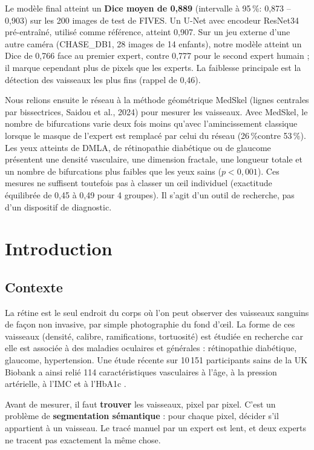 \documentclass[11pt,a4paper]{article}
\newcommand{\pct}{\,\%}
\begin{document}
Le modèle final atteint un \textbf{Dice moyen de 0,889} (intervalle à 95\pct : 0,873 -- 0,903) sur les 200 images de test de FIVES. Un U-Net avec encodeur ResNet34 pré-entraîné, utilisé comme référence, atteint 0,907. Sur un jeu externe d'une autre caméra (CHASE\_DB1, 28 images de 14 enfants), notre modèle atteint un Dice de 0,766 face au premier expert, contre 0,777 pour le second expert humain ; il marque cependant plus de pixels que les experts. La faiblesse principale est la détection des vaisseaux les plus fins (rappel de 0,46).

Nous relions ensuite le réseau à la méthode géométrique MedSkel (lignes centrales par bissectrices, Saidou et al., 2024) pour mesurer les vaisseaux. Avec MedSkel, le nombre de bifurcations varie deux fois moins qu'avec l'amincissement classique lorsque le masque de l'expert est remplacé par celui du réseau (26\pct contre 53\pct). Les yeux atteints de DMLA, de rétinopathie diabétique ou de glaucome présentent une densité vasculaire, une dimension fractale, une longueur totale et un nombre de bifurcations plus faibles que les yeux sains ($p<0{,}001$). Ces mesures ne suffisent toutefois pas à classer un œil individuel (exactitude équilibrée de 0,45 à 0,49 pour 4 groupes). Il s'agit d'un outil de recherche, pas d'un dispositif de diagnostic.

\tableofcontents
\newpage

\section{Introduction}

\subsection{Contexte}
La rétine est le seul endroit du corps où l'on peut observer des vaisseaux sanguins de façon non invasive, par simple photographie du fond d'œil. La forme de ces vaisseaux (densité, calibre, ramifications, tortuosité) est étudiée en recherche car elle est associée à des maladies oculaires et générales : rétinopathie diabétique, glaucome, hypertension. Une étude récente sur 10\,151 participants sains de la UK Biobank a ainsi relié 114 caractéristiques vasculaires à l'âge, à la pression artérielle, à l'IMC et à l'HbA1c \cite{yusufu}.

Avant de mesurer, il faut \textbf{trouver} les vaisseaux, pixel par pixel. C'est un problème de \textbf{segmentation sémantique} : pour chaque pixel, décider s'il appartient à un vaisseau. Le tracé manuel par un expert est lent, et deux experts ne tracent pas exactement la même chose.
\end{document}
